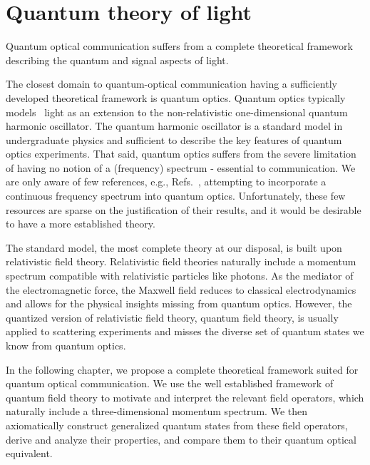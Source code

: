 \chapter{Quantum theory of light}\label{ch:light}

Quantum optical communication suffers from a complete theoretical framework describing the quantum and signal aspects of light.

The closest domain to quantum-optical communication having a sufficiently developed theoretical framework is quantum optics.
Quantum optics typically models~\cite{Fox2006,Gerry2005,Haroche2006,Meystre2007} light as an extension to the non-relativistic one-dimensional quantum harmonic oscillator.
The quantum harmonic oscillator is a standard model in undergraduate physics and sufficient to describe the key features of quantum optics experiments.
That said, quantum optics suffers from the severe limitation of having no notion of a (frequency) spectrum - essential to communication.
We are only aware of few references, e.g., Refs.~\cite{Barnett2002,Shapiro2009,Loudon2000}, attempting to incorporate a continuous frequency spectrum into quantum optics.
Unfortunately, these few resources are sparse on the justification of their results, and it would be desirable to have a more established theory.

The standard model, the most complete theory at our disposal, is built upon relativistic field theory.
Relativistic field theories naturally include a momentum spectrum compatible with relativistic particles like photons.
As the mediator of the electromagnetic force, the Maxwell field reduces to classical electrodynamics and allows for the physical insights missing from quantum optics.
However, the quantized version of relativistic field theory, quantum field theory, is usually applied to scattering experiments and misses the diverse set of quantum states we know from quantum optics.

In the following chapter, we propose a complete theoretical framework suited for quantum optical communication.
We use the well established framework of quantum field theory to motivate and interpret the relevant field operators, which naturally include a three-dimensional momentum spectrum.
We then axiomatically construct generalized quantum states from these field operators, derive and analyze their properties, and compare them to their quantum optical equivalent.
